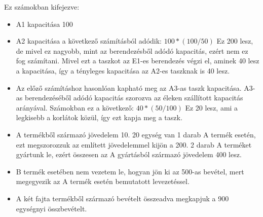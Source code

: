 Ez számokban kifejezve:
\begin{itemize}
	\item[] A1 kapacitása 100
	\item[] A2 kapacitása a következő számításból adódik: $100*(100/50)$ Ez 200 lesz, de mivel ez nagyobb, mint az berendezésből adódó kapacitás, ezért nem ez fog számítani. Mivel ezt a taszkot az E1-es berendezés végzi el, aminek 40 lesz a kapacitása, így a tényleges kapacitása az A2-es taszknak is 40 lesz.
	\item[] Az előző számításhoz hasonlóan kapható meg az A3-as taszk kapacitása. A3-as berendezéséből adódó kapacitás szorozva az éleken szállított  kapacitás arányával. Számokban ez a következő: $40*(50/100)$ Ez 20 lesz, ami a legkisebb a korlátok közül, így ezt kapja meg a taszk.
	\item[] A termékből származó jövedelem 10. 20 egység van 1 darab A termék esetén, ezt megszorozzuk az említett jövedelemmel kijön a 200. 2 darab A terméket gyártunk le, ezért összesen az A gyártásból származó jövedelem 400 lesz.
	\item[] B termék esetében nem vezetem le, hogyan jön ki az 500-as bevétel, mert megegyezik az A termék esetén bemutatott levezetéssel.
	\item[] A két fajta termékből származó bevételt összeadva megkapjuk a 900 egységnyi összbevételt.
\end{itemize}
